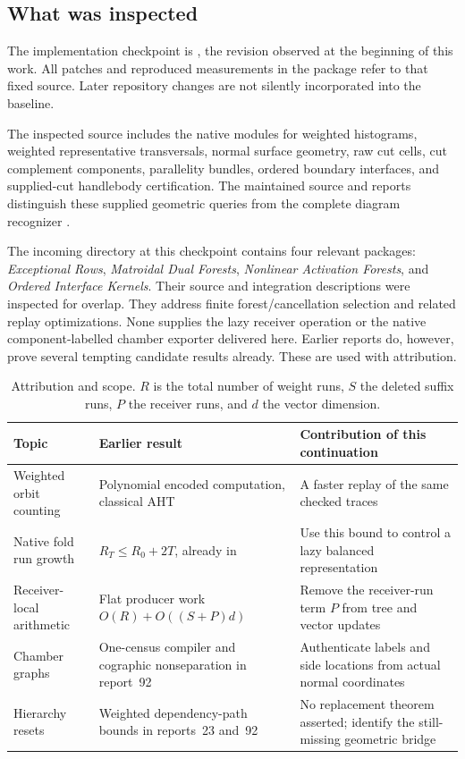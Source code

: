 \subsection{What was inspected}

The implementation checkpoint is \BaseCommit, the  revision
observed at the beginning of this work. All patches and reproduced
measurements in the package refer to that fixed source. Later repository
changes are not silently incorporated into the baseline.

The inspected source includes the native  modules for
weighted histograms, weighted representative transversals, normal surface
geometry, raw cut cells, cut complement components, parallelity bundles,
ordered boundary interfaces, and supplied-cut handlebody certification. The
maintained source and reports distinguish these supplied geometric queries
from the complete diagram recognizer \cite{repo}.

The incoming directory at this checkpoint contains four relevant packages:
\emph{Exceptional Rows}, \emph{Matroidal Dual Forests},
\emph{Nonlinear Activation Forests}, and \emph{Ordered Interface Kernels}.
Their source and integration descriptions were inspected for overlap.
They address finite forest/cancellation selection and related replay
optimizations. None supplies the lazy receiver operation or the native
component-labelled chamber exporter delivered here. Earlier reports do,
however, prove several tempting candidate results already. These
are used with attribution.

\begin{table}[htbp]
\centering\small
\begin{tabular}{L{0.24\textwidth}L{0.34\textwidth}L{0.32\textwidth}}
\toprule
Topic & Earlier result & Contribution of this continuation\\
\midrule
Weighted orbit counting &
Polynomial encoded computation, classical AHT &
A faster replay of the same checked traces\\
\addlinespace
Native fold run growth &
\(R_T\le R_0+2T\), already in  &
Use this bound to control a lazy balanced representation\\
\addlinespace
Receiver-local arithmetic &
Flat producer work \(O(R)+O((S+P)d)\) &
Remove the receiver-run term \(P\) from tree and vector updates\\
\addlinespace
Chamber graphs &
One-census compiler and cographic nonseparation in report~92 &
Authenticate labels and side locations from actual normal coordinates\\
\addlinespace
Hierarchy resets &
Weighted dependency-path bounds in reports~23 and~92 &
No replacement theorem asserted; identify the still-missing geometric bridge\\
\bottomrule
\end{tabular}
\caption{Attribution and scope. \(R\) is the total number of weight runs,
\(S\) the deleted suffix runs, \(P\) the receiver runs, and \(d\) the vector
dimension.}
\label{tab:scope}
\end{table}

